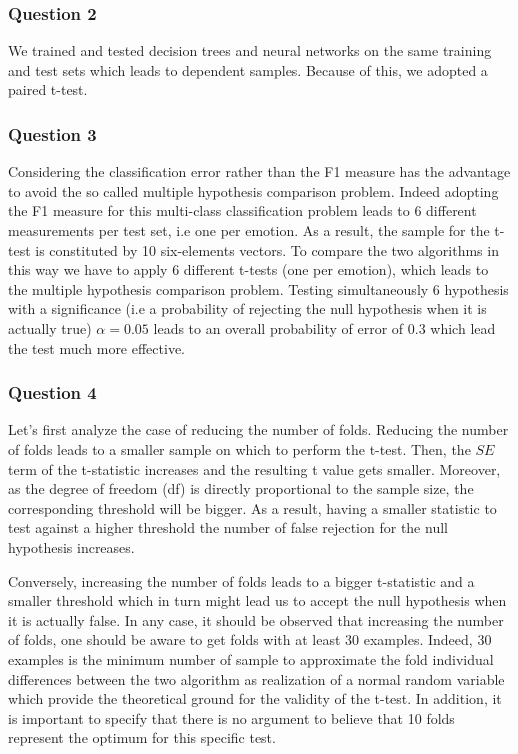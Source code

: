 \documentclass{article}
\begin{document}
\subsubsection*{Question 2}
We trained and tested decision trees and neural networks on the same training and test sets which leads to dependent samples. Because of this, we adopted a paired t-test. %

\subsubsection*{Question 3}
Considering the classification error rather than the F1 measure has the advantage to avoid the so called multiple hypothesis comparison problem. Indeed adopting the F1 measure for this multi-class classification problem leads to 6 different measurements per test set, i.e one per emotion. As a result, the sample for the t-test is constituted by 10 six-elements vectors. To compare the two algorithms in this way we have to apply 6 different t-tests (one per  emotion), which leads to the multiple hypothesis comparison problem. Testing simultaneously 6 hypothesis with a significance (i.e a probability of rejecting the null hypothesis when it is actually true) $\alpha=0.05$ leads to an overall probability of error of $0.3$ which lead the test much more effective. %

\subsubsection*{Question 4}
Let's first analyze the case of reducing the number of folds. Reducing the number of folds leads to a smaller sample on which to perform the t-test. Then, the $SE$ term of the t-statistic increases and the resulting t value gets smaller. Moreover, as the degree of freedom (df) is directly proportional to the sample size, the corresponding threshold will be bigger. As a result, having a smaller statistic to test against a higher threshold the number of false rejection for the null hypothesis increases. 

Conversely, increasing the number of folds leads to a bigger t-statistic and a smaller threshold which in turn might lead us to accept the null hypothesis when it is actually false. In any case, it should be observed that increasing the number of folds, one should be aware to get folds with at least 30 examples. Indeed, 30 examples is the minimum number of sample to approximate the fold individual differences between the two algorithm as realization of a normal random variable which provide the theoretical ground for the validity of the t-test. In addition, it is important to specify that there is no argument to believe that 10 folds represent the optimum for this specific test.
\end{document}

